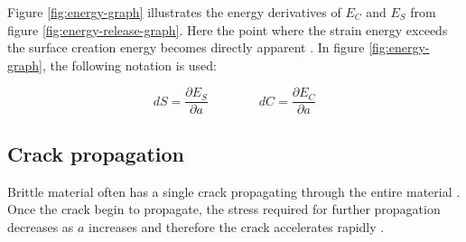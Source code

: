 Figure \vref{fig:energy-graph} illustrates the energy derivatives of
$E_C$ and $E_S$ from figure \vref{fig:energy-release-graph}. Here the
point where the strain energy exceeds the surface creation energy
becomes directly apparent .
%
In figure \vref{fig:energy-graph}, the following notation is used:

\begin{equation*}
dS = \frac{\partial E_S}{\partial a} \qquad \qquad dC = \frac{\partial E_C}{\partial a}
\end{equation*}





\subsection{Crack propagation}
%
%
%
Brittle material often has a single crack propagating through the
entire material .
%
Once the crack begin to propagate, the stress required for further
propagation decreases as $a$ increases and therefore the crack
accelerates rapidly .








